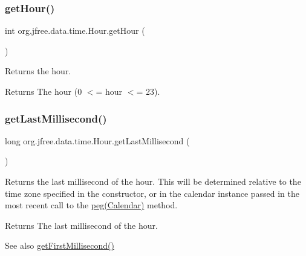 \subsubsection{\texorpdfstring{get\+Hour()}{getHour()}}
{\footnotesize\ttfamily int org.\+jfree.\+data.\+time.\+Hour.\+get\+Hour (\begin{DoxyParamCaption}{ }\end{DoxyParamCaption})}

Returns the hour.

\begin{DoxyReturn}{Returns}
The hour (0 $<$= hour $<$= 23). 
\end{DoxyReturn}
\mbox{\label{classorg_1_1jfree_1_1data_1_1time_1_1_hour_af4e68aff2d3a8379ec6f61ce3911f3ae}} 
\subsubsection{\texorpdfstring{get\+Last\+Millisecond()}{getLastMillisecond()}\hspace{0.1cm}{\footnotesize\ttfamily [1/2]}}
{\footnotesize\ttfamily long org.\+jfree.\+data.\+time.\+Hour.\+get\+Last\+Millisecond (\begin{DoxyParamCaption}{ }\end{DoxyParamCaption})}

Returns the last millisecond of the hour. This will be determined relative to the time zone specified in the constructor, or in the calendar instance passed in the most recent call to the \mbox{\hyperlink{classorg_1_1jfree_1_1data_1_1time_1_1_hour_af4edfe009983a54b3747e191fcdb59e6}{peg(\+Calendar)}} method.

\begin{DoxyReturn}{Returns}
The last millisecond of the hour.
\end{DoxyReturn}
\begin{DoxySeeAlso}{See also}
\mbox{\hyperlink{classorg_1_1jfree_1_1data_1_1time_1_1_hour_a180071a5f4e36222323074f091ed733f}{get\+First\+Millisecond()}} 
\end{DoxySeeAlso}
\mbox{\label{classorg_1_1jfree_1_1data_1_1time_1_1_hour_a9aa733aa471c73c8246085b08c764acd}} 

